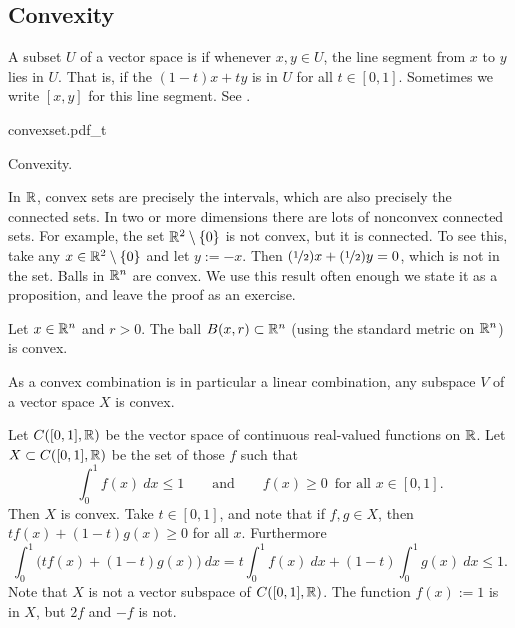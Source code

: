 \subsection{Convexity}

A subset $U$ of a vector space is \emph{}
if whenever $x,y \in U$, the line segment from
$x$ to $y$ lies in $U$.  That is, if the \emph{}
$(1-t)x+ty$ is in $U$ for all $t \in [0,1]$.
Sometimes we write $[x,y]$ for this line segment.
See .

\begin{myfigureht}
{convexset.pdf_t}
\caption{Convexity.\label{mv:convexcomb}}
\end{myfigureht}

In ${\mathbb{R}}$, convex sets are precisely the intervals, which are
also precisely the connected sets.
In two or more dimensions
there are lots of nonconvex connected sets.  For example,
the set ${\mathbb{R}}^2 \setminus \{0\}$ is not convex, but it is connected.  To see
this, take any $x \in {\mathbb{R}}^2 \setminus \{0\}$ and let $y:=-x$.
Then $(\nicefrac{1}{2})x + (\nicefrac{1}{2})y = 0$, which is not in the set.
Balls in ${\mathbb{R}}^n$ are convex.  We use this result often enough we state
it as a proposition, and leave the proof as an exercise.

\begin{prop}
Let $x \in {\mathbb{R}}^n$ and $r > 0$.  The ball $B(x,r) \subset {\mathbb{R}}^n$ (using the
standard metric on ${\mathbb{R}}^n$) is convex.
\end{prop}

\begin{example}
As a convex combination is in particular a linear combination,
any subspace $V$ of a vector space $X$ is convex.
\end{example}

\begin{example}
Let $C([0,1],{\mathbb{R}})$ be the vector space of continuous real-valued functions on ${\mathbb{R}}$.
Let $X \subset C([0,1],{\mathbb{R}})$ be the set of those $f$ such that
\begin{equation*}
\int_0^1 f(x)~dx \leq 1 \qquad \text{and} \qquad
f(x) \geq 0 \enspace \text{for all } x \in [0,1] .
\end{equation*}
Then $X$ is convex.  Take $t \in [0,1]$, and note that if $f,g \in X$,
then $t f(x) + (1-t) g(x) \geq 0$ for all $x$.  Furthermore
\begin{equation*}
\int_0^1 \bigl(tf(x) + (1-t)g(x)\bigr) ~dx
=
t \int_0^1 f(x) ~dx
+ (1-t)\int_0^1 g(x) ~dx \leq 1 .
\end{equation*}
Note that $X$ is not a vector subspace of $C([0,1],{\mathbb{R}})$.  The function
$f(x):=1$ is in $X$, but $2f$ and $-f$ is not.
\end{example}

